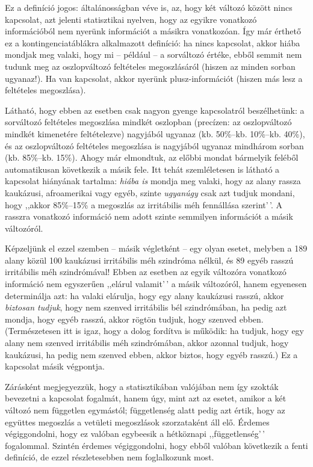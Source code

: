 \documentclass[
]{book}
\begin{document}
Ez a definíció jogos: általánosságban véve is, az, hogy két változó között nincs kapcsolat, azt jelenti statisztikai nyelven, hogy az egyikre vonatkozó információból nem nyerünk információt a másikra vonatkozóan. Így már érthető ez a kontingenciatáblákra alkalmazott definíció: ha nincs kapcsolat, akkor hiába mondjak meg valaki, hogy mi -- például -- a sorváltozó értéke, ebből semmit nem tudunk meg az oszlopváltozó feltételes megoszlásáról (hiszen az minden sorban ugyanaz!). Ha van kapcsolat, akkor nyerünk plusz-információt (hiszen más lesz a feltételes megoszlása).

Látható, hogy ebben az esetben csak nagyon gyenge kapcsolatról beszélhetünk: a sorváltozó feltételes megoszlása mindkét oszlopban (precízen: az oszlopváltozó mindkét kimenetére feltételezve) nagyjából ugyanaz (kb. 50\%--kb. 10\%--kb. 40\%), és az oszlopváltozó feltételes megoszlása is nagyjából ugyanaz mindhárom sorban (kb. 85\%--kb. 15\%). Ahogy már elmondtuk, az előbbi mondat bármelyik feléből automatikusan következik a másik fele. Itt tehát szemléletesen is látható a kapcsolat hiányának tartalma: \emph{hiába is} mondja meg valaki, hogy az alany rassza kaukázusi, afroamerikai vagy egyéb, szinte \emph{ugyanúgy} csak azt tudjuk mondani, hogy ,,akkor 85\%--15\% a megoszlás az irritábilis méh fennállása szerint'\,'. A rasszra vonatkozó információ nem adott szinte semmilyen információt a másik változóról.

Képzeljünk el ezzel szemben -- másik végletként -- egy olyan esetet, melyben a 189 alany közül 100 kaukázusi irritábilis méh szindróma nélkül, és 89 egyéb rasszú irritábilis méh szindrómával! Ebben az esetben az egyik változóra vonatkozó információ nem egyszerűen ,,elárul valamit'\,' a másik változóról, hanem egyenesen determinálja azt: ha valaki elárulja, hogy egy alany kaukázusi rasszú, akkor \emph{biztosan tudjuk}, hogy nem szenved irritábilis bél szindrómában, ha pedig azt mondja, hogy egyéb rasszú, akkor rögtön tudjuk, hogy szenved ebben. (Természetesen itt is igaz, hogy a dolog fordítva is működik: ha tudjuk, hogy egy alany nem szenved irritábilis méh szindrómában, akkor azonnal tudjuk, hogy kaukázusi, ha pedig nem szenved ebben, akkor biztos, hogy egyéb rasszú.) Ez a kapcsolat másik végpontja.

Zárásként megjegyezzük, hogy a statisztikában valójában nem így szokták bevezetni a kapcsolat fogalmát, hanem úgy, mint azt az esetet, amikor a két változó nem független egymástól; függetlenség alatt pedig azt értik, hogy az együttes megoszlás a vetületi megoszlások szorzataként áll elő. Érdemes végiggondolni, hogy ez valóban egybeesik a hétköznapi ,,függetlenség'\,' fogalommal. Szintén érdemes végiggondolni, hogy ebből valóban következik a fenti definíció, de ezzel részletesebben nem foglalkozunk most.
\end{document}
